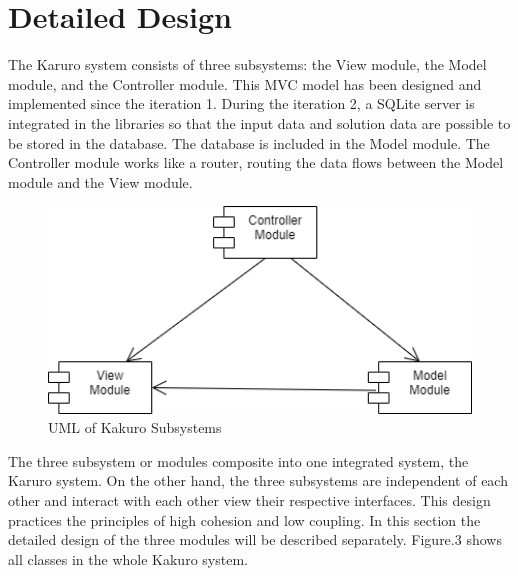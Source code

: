 \documentclass[12pt]{article}
\begin{document}
\newpage

\section{Detailed Design} \label{sec:detail}

The Karuro system consists of three subsystems: the View module, the Model module, and the Controller module. This MVC model has been designed and implemented since the iteration 1. During the iteration 2, a SQLite server is integrated in the libraries so that the input data and solution data are possible to be stored in the database. The database is included in the Model module. The Controller module works like a router, routing the data flows between the Model module and the View module.  

\begin{figure}[htbp]
    \includegraphics[width=1\textwidth]{Subsystems_UML}
    \caption{UML of Kakuro Subsystems}
    \label{fig:Subsystems_UML}
\end{figure}

The three subsystem or modules composite into one integrated system, the Karuro system. On the other hand, the three subsystems are independent of each other and interact with each other view their respective interfaces. This design practices the principles of high cohesion and low coupling. In this section the detailed design of the three modules will be described separately. Figure.3 shows all classes in the whole Kakuro system.
\end{document}
